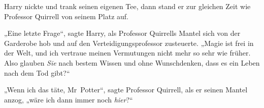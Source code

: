 Harry nickte und trank seinen eigenen Tee, dann stand er zur gleichen Zeit wie Professor Quirrell von seinem Platz auf.

„Eine letzte Frage“, sagte Harry, als Professor Quirrells Mantel sich von der Garderobe hob und auf den Verteidigungsprofessor zusteuerte. „Magie ist frei in der Welt, und ich vertraue meinen Vermutungen nicht mehr so sehr wie früher. Also glauben \emph{Sie} nach bestem Wissen und ohne Wunschdenken, dass es ein Leben nach dem Tod gibt?“

„Wenn ich das täte, Mr~Potter“, sagte Professor Quirrell, als er seinen Mantel anzog, „wäre ich dann immer noch \emph{hier}?“

